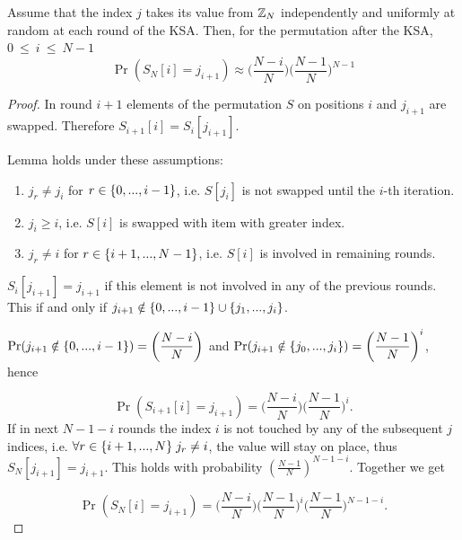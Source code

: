 	\begin{lemma}
	Assume that the index $ j $ takes its value from $ \mathbb{Z}_{N} $ independently
	and uniformly at random at each round of the KSA. Then, for the permutation after the KSA, $ 0~\leq~i~\leq~N-1 $
	\begin{equation}\label{lemma2}
	\Pr(S_{N}[i] = j_{i+1}) \approx \bigg(\dfrac{N-i}{N}\bigg)\bigg(\dfrac{N-1}{N}\bigg)^{N-1}
	\end{equation}
	\end{lemma}
	\begin{proof}
		In round $ i+1 $ elements of the permutation $ S $ on positions $ i $ and $ j_{i+1} $ are swapped. Therefore $ S_{i+1}[i] = S_{i}[j_{i+1}] $.
		
		Lemma holds under these assumptions:
		\begin{enumerate}
			\item $ j_{r} \neq j_{i} $ for $ r \in \{0, ... , i-1\}$, i.e. $ S[j_{i}] $ is not swapped until the $ i $-th iteration.
			\item $ j_{i} \geq i $, i.e. $ S[i] $ is swapped with item with greater index.
			\item $ j_{r} \neq i $ for $ r \in \{i+1, ... , N-1\}$, i.e. $ S[i] $ is involved in remaining rounds. 
		\end{enumerate} 
		
		$ S_{i}[j_{i+1}] = j_{i+1} $ if this element is not involved in any of the previous rounds. This  if and only if $ j_{i+1} \notin \{0, ... , i-1\} \cup \{j_{1}, ... , j_{i}\} $.
		
		$ \Pr(j_{i+1} \notin \{0, ... , i-1\}) = \left(\dfrac{N-i}{N}\right) $ and
		$ \Pr(j_{i+1} \notin \{j_{0}, ... , j_{i}\}) = \left(\dfrac{N-1}{N}\right)^{i} $,
		hence 
		
		\[ \Pr(S_{i+1}[i] = j_{i+1}) = \bigg( \dfrac{N-i}{N}\bigg)
									\bigg( \dfrac{N-1}{N}\bigg)^{i}.\]
		If in next $ N-1-i $ rounds the index $ i $ is not touched by any of the subsequent $ j $ indices, i.e. $ \forall r \in \{i+1, ... , N\} \; j_{r} \neq i $, the value will stay on place, thus 	$ S_{N}[j_{i+1}] = j_{i+1} $.  This holds with probability $(\frac{N-1}{N})^{N-1-i} $. Together we get
		
		\[\Pr(S_{N}[i] = j_{i+1}) =  \bigg( \dfrac{N-i}{N}\bigg)
		\bigg( \dfrac{N-1}{N}\bigg)^{i}
		\bigg( \dfrac{N-1}{N}\bigg)^{N-1-i}. \]
		
	\end{proof}


